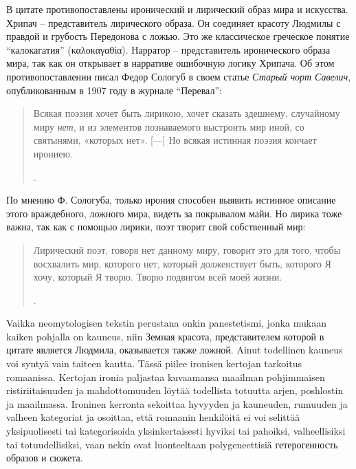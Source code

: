 \documentclass[12pt,a4paper]{article}
\begin{document}

В цитате противопоставлены иронический и лирический образ мира и искусства. Хрипач – представитель лирического образа. Он соединяет красоту Людмилы с правдой и грубость Передонова с ложью. Это же классическое греческое понятие \enquote{калокагатия} (\foreignlanguage{greek}{καλοκαγαθία}).  Нарратор – представитель иронического образа мира, так как он открывает в нарративе ошибочную логику Хрипача. Об этом противопоставлении писал Федор Сологуб в своем статье \textit{Старый чорт Савелич}, опубликованным в 1907 году в журнале \enquote{Перевал}:  

\begin{quote}
Всякая поэзия хочет быть лирикою, хочет сказать здешнему,
случайному миру \textit{нет}, и из элементов познаваемого выстроить
мир иной, со святынями, «которых нет».
[---]
Но всякая истинная поэзия кончает ирониею.

\parencite[164]{sologub1991}.
\end{quote}

По мнению Ф. Сологуба, только ирония способен выявить истинное описание этого враждебного, ложного мира, видеть за покрывалом майи. Но лирика тоже важна, так как с помощью лирики, поэт творит свой собственный мир:

\begin{quote}
 Лирический поэт, говоря нет данному миру, говорит это для того, чтобы восхвалить мир, которого нет, который долженствует быть, которого Я хочу, который Я творю. Творю подвигом всей моей жизни. 
 
\parencite[170]{sologub1991}.
 \end{quote}

Vaikka neomytologisen tekstin perustana onkin panestetismi, jonka mukaan kaiken pohjalla on kauneus, niin Земная красота, представителем которой в цитате является Людмила, оказывается также ложной. Ainut todellinen kauneus voi syntyä vain taiteen kautta. Tässä piilee ironisen kertojan tarkoitus romaanissa. Kertojan ironia paljastaa kuvaamansa maailman pohjimmaisen ristiriitaisuuden ja mahdottomuuden löytää todellista totuutta arjen, poshlostin ja maailmassa. Ironinen kerronta sekoittaa hyvyyden ja kauneuden, rumuuden ja valheen kategoriat ja osoittaa, että romaanin henkilöitä ei voi selittää yksipuolisesti tai kategorisoida yksinkertaisesti hyviksi tai pahoiksi, valheellisiksi tai totuudellisiksi, vaan nekin ovat luonteeltaan polygeneettisiä гетерогенность образов и сюжета.
\end{document}
